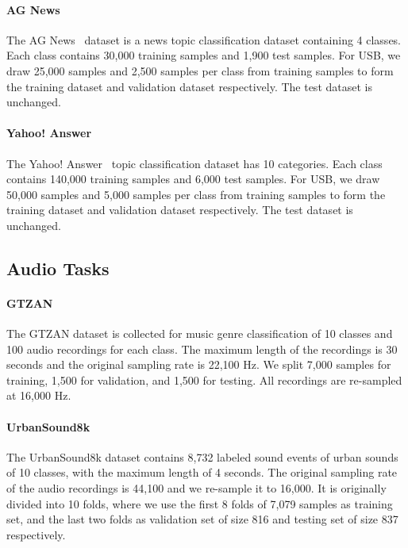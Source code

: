 \documentclass{article}
\begin{document}
\paragraph{AG News}
The AG News~\cite{zhang2015character} dataset is a news topic classification dataset containing 4 classes. Each class contains 30,000 training samples and 1,900 test samples. For USB, we draw 25,000 samples and 2,500 samples per class from training samples to form the training dataset and validation dataset respectively. The test dataset is unchanged.






\paragraph{Yahoo! Answer}
The Yahoo! Answer~\cite{chang2008importance} topic classification dataset has 10 categories. Each class contains 140,000 training samples and 6,000 test samples. For USB, we draw 50,000 samples and 5,000 samples per class from training samples to form the training dataset and validation dataset respectively. The test dataset is unchanged.


\subsection{Audio Tasks}
\label{sec-details-usb-audio}

\paragraph{GTZAN}
The GTZAN dataset is collected for music genre classification of 10 classes and 100 audio recordings for each class. The maximum length of the recordings is 30 seconds and the original sampling rate is 22,100 Hz. We split 7,000 samples for training, 1,500 for validation, and 1,500 for testing. All recordings are re-sampled at 16,000 Hz.

\paragraph{UrbanSound8k}
The UrbanSound8k dataset \cite{salamon2014dataset} contains 8,732 labeled sound events of urban sounds of 10 classes, with the maximum length of 4 seconds. The original sampling rate of the audio recordings is 44,100 and we re-sample it to 16,000. It is originally divided into 10 folds, where we use the first 8 folds of 7,079 samples as training set, and the last two folds as validation set of size 816 and testing set of size 837 respectively.
\end{document}

